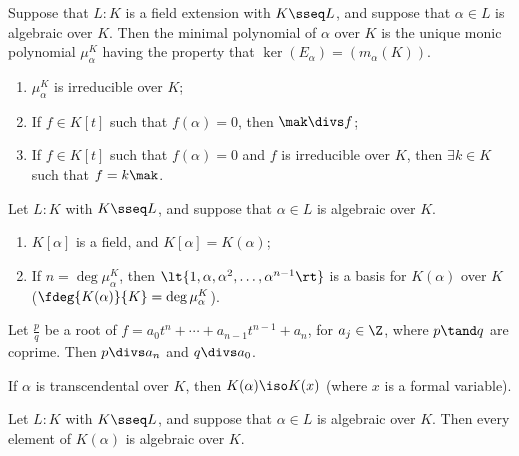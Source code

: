 \documentclass[a4paper]{article}
\begin{document}
\begin{tdefinition}
  Suppose that \( L : K \) is a field extension with \( K \sseq L \), and suppose that \( \alpha\in L \) is algebraic over \( K \).
  Then the minimal polynomial of \( \alpha \) over \( K \) is the unique monic polynomial \( \mu_\alpha^K \) having the property that \( \ker(E_\alpha) = (m_\alpha(K)) \).
\end{tdefinition}

\begin{tlemma}
  \begin{enumerate}
    \item \( \mu_\alpha^K \) is irreducible over \( K \);
    \item If \( f\in K[t] \) such that \( f(\alpha) = 0 \), then \( \mak\divs f \);
    \item If \( f\in K[t] \) such that \( f(\alpha) = 0 \) and \( f \) is irreducible over \( K \), then \( \exists k\in K \) such that \( f=k\mak \).
  \end{enumerate}
\end{tlemma}

\begin{ttheorem}
  Let \( L : K \) with \( K \sseq L \), and suppose that \( \alpha\in L \) is algebraic over \( K \).
  \begin{enumerate}[label=(\roman*)]
    \item \( K[\alpha] \) is a field, and \( K[\alpha] = K(\alpha) \);
    \item If \( n=\deg \mu_\alpha^K \), then \( \lt\{ 1,\alpha,\alpha^2,\ldots,\alpha^{n-1} \rt\} \) is a basis for \( K(\alpha) \) over \( K \) (\imp \( \fdeg{K(\alpha)}{K}=\deg \mu_\alpha^K \)).
  \end{enumerate}
\end{ttheorem}

\begin{ttheorem}
  Let \( \frac{p}{q} \) be a root of \( f= a_0t^n+\cdots + a_{n-1} t^{n-1} + a_n \), for \( a_j\in\Z \), where \( p\tand q \) are coprime.
  Then \( p\divs a_n \) and \( q\divs a_0 \).
\end{ttheorem}

\quad If \( \alpha \) is transcendental over \( K \), then \( K(\alpha)\iso K(x) \) (where \( x \) is a formal variable).

\begin{tcorollary}
  Let \( L : K \) with \( K \sseq L \), and suppose that \( \alpha\in L \) is algebraic over \( K \).
  Then every element of \( K(\alpha) \) is algebraic over \( K \).
\end{tcorollary}
\end{document}
